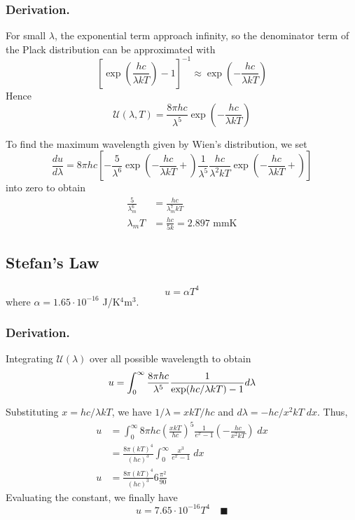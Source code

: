 \documentclass[../../../Main.tex]{subfiles}
\begin{document}
\subsubsection{Derivation.} For small $\lambda$, the exponential term approach infinity, so the denominator term of the Plack distribution can be approximated with
\begin{equation*}
    \left[\exp\left(\frac{hc}{\lambda kT}\right)-1\right]^{-1}\approx \exp\left(-\frac{hc}{\lambda kT}\right)
\end{equation*}
Hence 
\begin{equation*}
    \mathcal{U}(\lambda,T)=\frac{8\pi hc}{\lambda^5}\exp\left(-\frac{hc}{\lambda kT}\right)
\end{equation*}

To find the maximum wavelength given by Wien's distribution, we set 
\begin{equation*}
    \frac{du}{d\lambda}=8\pi hc\left[-\frac{5}{\lambda^6}\exp\left( -\frac{hc}{\lambda kT}+\right)\frac{1}{\lambda^5}\frac{hc}{\lambda^2kT}\exp\left( -\frac{hc}{\lambda kT}+\right)\right]
\end{equation*}
into zero to obtain
\begin{align*}
    \frac{5}{\lambda_m^6}&=\frac{hc}{\lambda_m^7kT}\\
    \lambda_m T&=\frac{hc}{5k}=2.897 \text{ mmK}
\end{align*}


\subsection{Stefan's Law}
\begin{equation*}
    u=\alpha T^4
\end{equation*}
where $\alpha=1.65\cdot10^{-16}$ J/K$^{4}$m$^{3}$.

\subsubsection{Derivation.} Integrating $\mathcal{U}(\lambda)$ over all possible wavelength to obtain
\begin{equation*}
    u=\int_0^\infty\frac{8\pi hc}{\lambda^5}\frac{1}{\exp(hc/\lambda k T)-1}d\lambda\\
\end{equation*}

Substituting $x=hc/\lambda kT$, we have $1/\lambda=xkT/hc$ and $d\lambda=-hc/x^2kT\;dx$. Thus,
\begin{align*}
    u&=\int_0^\infty 8\pi hc \left(\frac{xkT}{hc}\right)^5\frac{1}{e^x-1}\left(-\frac{hc}{x^2kT}\right)\;dx\\
    &=\frac{8\pi (kT)^4}{(hc)^3}\int_{0}^{\infty}\frac{x^3}{e^x-1}\;dx\\
    u&=\frac{8\pi (kT)^4}{(hc)^3}6\frac{\pi^2}{90}
\end{align*}
Evaluating the constant, we finally have 
\begin{equation*}
    u=7.65\cdot10^{-16} T^4\quad\blacksquare
\end{equation*}
\end{document}

